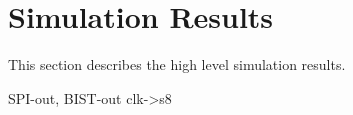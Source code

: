 \section{Simulation Results} \label{sec:simulation_results}
This section describes the high level simulation results. 

SPI-out, BIST-out clk->s8
